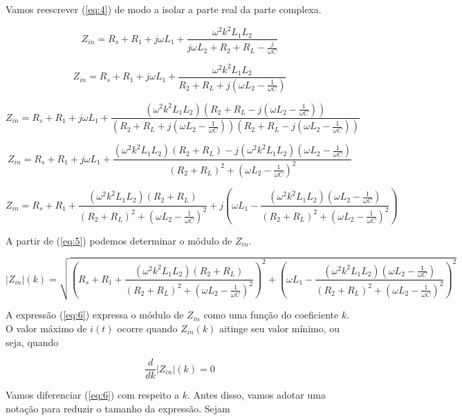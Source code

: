 \documentclass[12pt]{scrartcl}
\begin{document}
    Vamos reescrever (\ref{eq:4}) de modo a isolar a parte real da parte complexa.

    \[ Z_{in} = R_s + R_1 + j \omega L_1 + \frac{\omega^2k^2L_1L_2}{j\omega L_2 + R_2 + R_L - \frac{j}{\omega C}} \]

    \[ Z_{in} = R_s + R_1 + j \omega L_1 + \frac{\omega^2k^2L_1L_2}{R_2 + R_L + j(\omega L_2 - \frac{1}{\omega C})} \]

    \[ Z_{in} = R_s + R_1 + j \omega L_1 + \frac{(\omega^2k^2L_1L_2)(R_2 + R_L - j(\omega L_2 - \frac{1}{\omega C}))}{(R_2 + R_L + j(\omega L_2 - \frac{1}{\omega C}))(R_2 + R_L - j(\omega L_2 - \frac{1}{\omega C}))} \]

    \[ Z_{in} = R_s + R_1 + j \omega L_1 + \frac{(\omega^2k^2L_1L_2)(R_2 + R_L) - j(\omega^2k^2L_1L_2)(\omega L_2 - \frac{1}{\omega C})}{(R_2 + R_L)^2 + (\omega L_2 - \frac{1}{\omega C})^2} \]

    \begin{equation}\label{eq:5}
        Z_{in} = R_s + R_1 + \frac{(\omega^2k^2L_1L_2)(R_2 + R_L)}{(R_2 + R_L)^2 + (\omega L_2 - \frac{1}{\omega C})^2} + j \left(\omega L_1 - \frac{(\omega^2k^2L_1L_2)(\omega L_2 - \frac{1}{\omega C})}{(R_2 + R_L)^2 + (\omega L_2 - \frac{1}{\omega C})^2}\right)
    \end{equation}

    A partir de (\ref{eq:5}) podemos determinar o módulo de \(Z_{in}\).

    \begin{equation}\label{eq:6}
        |Z_{in}|(k) = \sqrt{\left(R_s + R_1 + \frac{(\omega^2k^2L_1L_2)(R_2 + R_L)}{(R_2 + R_L)^2 + (\omega L_2 - \frac{1}{\omega C})^2}\right)^2 + \left(\omega L_1 - \frac{(\omega^2k^2L_1L_2)(\omega L_2 - \frac{1}{\omega C})}{(R_2 + R_L)^2 + (\omega L_2 - \frac{1}{\omega C})^2}\right)^2}
    \end{equation}

    A expressão (\ref{eq:6}) expressa o módulo de \(Z_{in}\) como uma função do coeficiente \(k\). O valor máximo de \(i(t)\) ocorre quando \(Z_{in}(k)\) aitinge seu valor mínimo, ou seja, quando

    \begin{equation}\label{eq:7}
        \frac{d}{dk}|Z_{in}|(k) = 0
    \end{equation}

    Vamos diferenciar (\ref{eq:6}) com respeito a \(k\). Antes disso, vamos adotar uma notação para reduzir o tamanho da expressão.\newline
    Sejam
\end{document}
